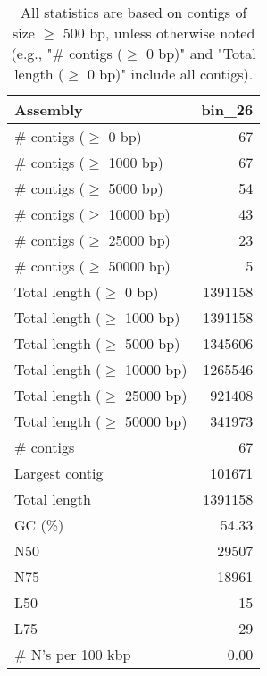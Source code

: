 \documentclass[12pt,a4paper]{article}
\begin{document}
\begin{table}[ht]
\begin{center}
\caption{All statistics are based on contigs of size $\geq$ 500 bp, unless otherwise noted (e.g., "\# contigs ($\geq$ 0 bp)" and "Total length ($\geq$ 0 bp)" include all contigs).}
\begin{tabular}{|l*{1}{|r}|}
\hline
Assembly & bin\_26 \\ \hline
\# contigs ($\geq$ 0 bp) & 67 \\ \hline
\# contigs ($\geq$ 1000 bp) & 67 \\ \hline
\# contigs ($\geq$ 5000 bp) & 54 \\ \hline
\# contigs ($\geq$ 10000 bp) & 43 \\ \hline
\# contigs ($\geq$ 25000 bp) & 23 \\ \hline
\# contigs ($\geq$ 50000 bp) & 5 \\ \hline
Total length ($\geq$ 0 bp) & 1391158 \\ \hline
Total length ($\geq$ 1000 bp) & 1391158 \\ \hline
Total length ($\geq$ 5000 bp) & 1345606 \\ \hline
Total length ($\geq$ 10000 bp) & 1265546 \\ \hline
Total length ($\geq$ 25000 bp) & 921408 \\ \hline
Total length ($\geq$ 50000 bp) & 341973 \\ \hline
\# contigs & 67 \\ \hline
Largest contig & 101671 \\ \hline
Total length & 1391158 \\ \hline
GC (\%) & 54.33 \\ \hline
N50 & 29507 \\ \hline
N75 & 18961 \\ \hline
L50 & 15 \\ \hline
L75 & 29 \\ \hline
\# N's per 100 kbp & 0.00 \\ \hline
\end{tabular}
\end{center}
\end{table}
\end{document}
